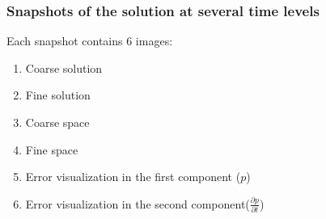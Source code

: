 \subsubsection{Snapshots of the solution at several time levels}
Each snapshot contains 6 images:
\begin{enumerate}
	\item Coarse solution
	\item Fine solution
	\item Coarse space
	\item Fine space
	\item Error visualization in the first component ($p$)
	\item Error visualization in the second component($\frac{\partial p}{\partial t}$)
\end{enumerate}

